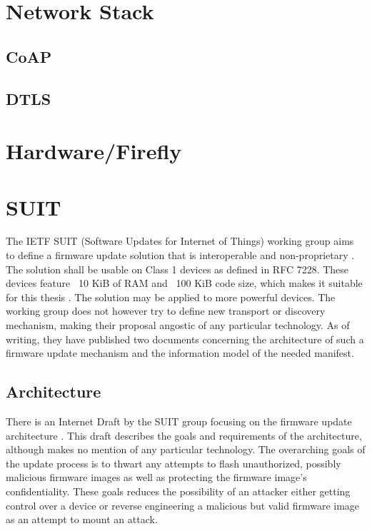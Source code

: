 \documentclass[0-thesis.tex]{subfiles}
\begin{document}
\section{Network Stack}
\subsection{CoAP}

\subsection{DTLS}

\section{Hardware/Firefly}

\section{SUIT}
The IETF SUIT (Software Updates for Internet of Things) working group aims to define a firmware 
update solution that is interoperable and non-proprietary \parencite{suit}. The solution shall 
be usable on Class 1 devices as defined in RFC 7228. These devices feature ~10 KiB of RAM and 
~100 KiB code size, which makes it suitable for this thesis \parencite{rfc7228}. The solution 
may be applied to more powerful devices. The working group does not however try to define 
new transport or discovery mechanism, making their proposal angostic of any particular 
technology. As of writing, they have published two documents concerning the architecture of 
such a firmware update mechanism and the information model of the needed manifest.

\subsection{Architecture}
There is an Internet Draft by the SUIT group focusing on the firmware update architecture 
\parencite{suit-architecture}. This draft describes the goals and requirements of the 
architecture, although makes no mention of any particular technology. The overarching goals 
of the update process is to thwart any attempts to flash unauthorized, possibly malicious 
firmware images as well as protecting the firmware image's confidentiality. These goals 
reduces the possibility of an attacker either getting control over a device or 
reverse engineering a malicious but valid firmware image as an attempt to mount an attack.
\end{document}
